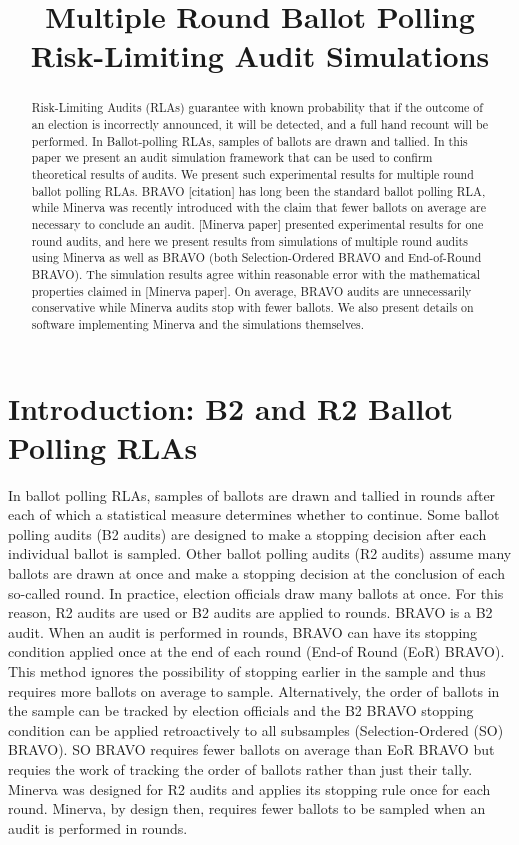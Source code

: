 \documentclass{article}
\title{Multiple Round Ballot Polling Risk-Limiting Audit Simulations}
\author{ }
\date{ }
\begin{document}
\maketitle

\begin{abstract}
    Risk-Limiting Audits (RLAs) guarantee with known probability 
    that if the outcome of an 
    election is incorrectly announced, it will be detected, 
    and a full hand recount will be performed. 
    In Ballot-polling RLAs, samples of ballots are drawn and tallied.
    In this paper we present an audit simulation framework
    that can be used to confirm theoretical results of audits.
    We present such experimental results for multiple round 
    ballot polling RLAs.
    BRAVO [citation] has long been the standard ballot polling RLA,
    while Minerva was recently introduced with the claim
    that fewer ballots on average are necessary to conclude 
    an audit.
    [Minerva paper] presented experimental
    results for one round audits, and here
    we present results
    from simulations of multiple round audits using Minerva 
    as well as BRAVO 
    (both Selection-Ordered 
    BRAVO and End-of-Round BRAVO).
    The simulation results agree within reasonable error with
    the mathematical properties claimed in [Minerva paper].
    On average, BRAVO audits are unnecessarily conservative 
    while Minerva audits stop with fewer ballots. We also
    present details on software implementing Minerva and
    the simulations themselves.
\end{abstract}

\section{Introduction: B2 and R2 Ballot Polling RLAs}
In ballot polling RLAs, samples of ballots are drawn and tallied
in rounds
after each of which a statistical measure determines whether to
continue. 
Some ballot polling audits (B2 audits) 
are designed to make a stopping decision
after each individual ballot is sampled.
Other ballot polling audits (R2 audits) assume many ballots are drawn
at once and make a stopping decision at the conclusion of each 
so-called round.
In practice, election officials draw many ballots at once.
For this reason, R2 audits are used or B2 audits are applied to 
rounds.
BRAVO is a B2 audit. 
When an audit is performed in rounds, BRAVO can have its
stopping condition applied once at the end of each round
(End-of Round (EoR) BRAVO).
This method ignores the possibility of stopping earlier in the 
sample and thus requires more ballots on average to sample.
Alternatively, the order of ballots in the sample can be tracked
by election officials and the B2 BRAVO stopping condition can 
be applied retroactively to all subsamples 
(Selection-Ordered (SO) BRAVO).
SO BRAVO requires fewer ballots on average than EoR BRAVO but
requies the work of tracking the order of ballots rather than
just their tally.
Minerva was designed for R2 audits and applies its stopping rule
once for each round.
Minerva, by design then, requires fewer ballots to be sampled when 
an audit is performed in rounds.
\end{document}
